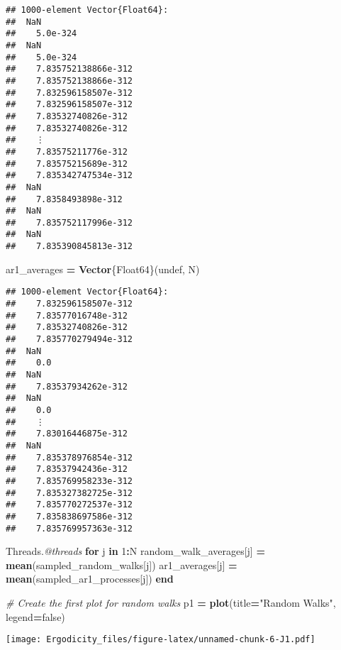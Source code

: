 \documentclass[
]{article}
\newenvironment{Shaded}{\begin{snugshade}}{\end{snugshade}}
\newcommand{\BuiltInTok}[1]{#1}
\newcommand{\CommentTok}[1]{\textcolor[rgb]{0.56,0.35,0.01}{\textit{#1}}}
\newcommand{\ConstantTok}[1]{\textcolor[rgb]{0.56,0.35,0.01}{#1}}
\newcommand{\ControlFlowTok}[1]{\textcolor[rgb]{0.13,0.29,0.53}{\textbf{#1}}}
\newcommand{\DataTypeTok}[1]{\textcolor[rgb]{0.13,0.29,0.53}{#1}}
\newcommand{\FloatTok}[1]{\textcolor[rgb]{0.00,0.00,0.81}{#1}}
\newcommand{\FunctionTok}[1]{\textcolor[rgb]{0.13,0.29,0.53}{\textbf{#1}}}
\newcommand{\KeywordTok}[1]{\textcolor[rgb]{0.13,0.29,0.53}{\textbf{#1}}}
\newcommand{\NormalTok}[1]{#1}
\newcommand{\OperatorTok}[1]{\textcolor[rgb]{0.81,0.36,0.00}{\textbf{#1}}}
\newcommand{\PreprocessorTok}[1]{\textcolor[rgb]{0.56,0.35,0.01}{\textit{#1}}}
\newcommand{\StringTok}[1]{\textcolor[rgb]{0.31,0.60,0.02}{#1}}
\begin{document}
\begin{verbatim}
## 1000-element Vector{Float64}:
##  NaN
##    5.0e-324
##  NaN
##    5.0e-324
##    7.835752138866e-312
##    7.835752138866e-312
##    7.832596158507e-312
##    7.832596158507e-312
##    7.83532740826e-312
##    7.83532740826e-312
##    ⋮
##    7.83575211776e-312
##    7.83575215689e-312
##    7.835342747534e-312
##  NaN
##    7.8358493898e-312
##  NaN
##    7.835752117996e-312
##  NaN
##    7.835390845813e-312
\end{verbatim}

\begin{Shaded}
\begin{Highlighting}[]
\NormalTok{ar1\_averages }\OperatorTok{=} \FunctionTok{Vector}\DataTypeTok{\{Float64\}}\NormalTok{(}\ConstantTok{undef}\NormalTok{, N)}
\end{Highlighting}
\end{Shaded}

\begin{verbatim}
## 1000-element Vector{Float64}:
##    7.832596158507e-312
##    7.83577016748e-312
##    7.83532740826e-312
##    7.835770279494e-312
##  NaN
##    0.0
##  NaN
##    7.83537934262e-312
##  NaN
##    0.0
##    ⋮
##    7.83016446875e-312
##  NaN
##    7.835378976854e-312
##    7.83537942436e-312
##    7.835769958233e-312
##    7.835327382725e-312
##    7.835770272537e-312
##    7.835838697586e-312
##    7.835769957363e-312
\end{verbatim}

\begin{Shaded}
\begin{Highlighting}[]

\BuiltInTok{Threads}\NormalTok{.}\PreprocessorTok{@threads} \ControlFlowTok{for}\NormalTok{ j }\KeywordTok{in} \FloatTok{1}\OperatorTok{:}\NormalTok{N}
\NormalTok{    random\_walk\_averages[j] }\OperatorTok{=} \FunctionTok{mean}\NormalTok{(sampled\_random\_walks[j])}
\NormalTok{    ar1\_averages[j] }\OperatorTok{=} \FunctionTok{mean}\NormalTok{(sampled\_ar1\_processes[j])}
\ControlFlowTok{end}

\CommentTok{\# Create the first plot for random walks}
\NormalTok{p1 }\OperatorTok{=} \FunctionTok{plot}\NormalTok{(title}\OperatorTok{=}\StringTok{"Random Walks"}\NormalTok{, legend}\OperatorTok{=}\ConstantTok{false}\NormalTok{)}
\end{Highlighting}
\end{Shaded}

\texttt{[image: Ergodicity\_files/figure-latex/unnamed-chunk-6-J1.pdf]}
\end{document}
